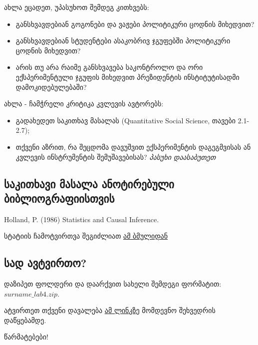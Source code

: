 \documentclass{article}\usepackage[]{graphicx}\usepackage[]{color}
\begin{document}
ახლა ეცადეთ, უპასუხოთ შემდეგ კითხვებს:

\begin{itemize}
\item{განსხვავდებიან გოგონები და ვაჟები პოლიტიკური ცოდნის მიხედვით?}
\item{განსხვავდებიან სტუდენტები ასაკობრივ ჯგუფებში პოლიტიკური ცოდნის მიხედვით?}
\item{არის თუ არა რაიმე განსხვავება საკონტროლო და ორი ექსპერიმენტული ჯგუფის მიხედვით პრეზიდენტის ინსტიტუტისადმი დამოკიდებულებაში?}
\end{itemize}

ახლა - ჩამჭრელი კრიტიკა კვლევის ავტორებს:

\begin{itemize}
\item{გადახედეთ საკითხავ მასალას (Quantitative Social Science, თავები 2.1-2.7);}
\item{თქვენი აზრით, რა შეცდომა დავუშვით ექსპერიმენტის დაგეგმვისას ან კვლევის ინსტრუმენტის შემუშავებისას? 
\emph{პასუხი დაასაბუთეთ}}
\end{itemize}


\subsection*{საკითხავი მასალა ანოტირებული ბიბლიოგრაფიისთვის}

Holland, P. (1986) Statistics and Causal Inference. 

სტატიის ჩამოტვირთვა შეგიძლიათ \href{https://www.dropbox.com/s/u4qjvf9swowl09q/Holland1986.pdf?dl=0}{ამ ბმულიდან}

\subsection*{სად ავტვირთო?}

დაზიპეთ ფოლდერი და დაარქვით სახელი შემდეგი ფორმატით: $surname\_lab4.zip$.

ატვირთეთ თქვენი დავალება \href{https://www.dropbox.com/request/A6dJZPAgkwRKgfTWtgzg}{ამ ლინკზე} მომდევნო შეხვედრის დაწყებამდე.


წარმატებები!
\end{document}
